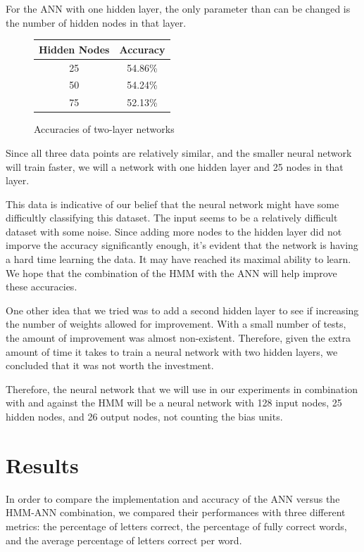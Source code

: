 \documentclass[11pt,a4paper,twocolumn]{article}
\begin{document}
For the ANN with one hidden layer, the only parameter than can be changed is the number of hidden nodes in that layer.
\begin{figure}[h]
\caption{Accuracies of two-layer networks}
\centering
\begin{tabular}{|c|c|}
\hline 
Hidden Nodes & Accuracy \\ 
\hline 
25 & 54.86\% \\ 
\hline 
50 & 54.24\% \\ 
\hline 
75 & 52.13\% \\ 
\hline 
\end{tabular} 
\end{figure}

Since all three data points are relatively similar, and the smaller neural network will train faster, we will a network with one hidden layer and 25 nodes in that layer.

This data is indicative of our belief that the neural network might have some difficultly classifying this dataset. The input seems to be a relatively difficult dataset with some noise. Since adding more nodes to the hidden layer did not imporve the accuracy significantly enough, it's evident that the network is having a hard time learning the data. It may have reached its maximal ability to learn. We hope that the combination of the HMM with the ANN will help improve these accuracies.

One other idea that we tried was to add a second hidden layer to see if increasing the number of weights allowed for improvement. With a small number of tests, the amount of improvement was almost non-existent. Therefore, given the extra amount of time it takes to train a neural network with two hidden layers, we concluded that it was not worth the investment.

Therefore, the neural network that we will use in our experiments in combination with and against the HMM will be a neural network with 128 input nodes, 25 hidden nodes, and 26 output nodes, not counting the bias units.


\section{Results}

In order to compare the implementation and accuracy of the ANN versus the HMM-ANN combination, we compared their performances with three different metrics: the percentage of letters correct, the percentage of fully correct words, and the average percentage of letters correct per word. 
\end{document}
